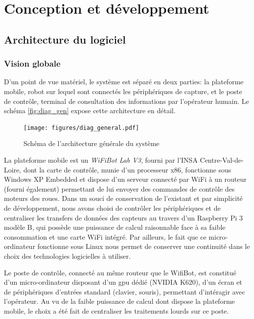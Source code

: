 \chapter{Conception et développement}
\label{ch:condev}

	\section{Architecture du logiciel}

		\subsection{Vision globale}
			
			D'un point de vue matériel, le système est séparé en deux parties: la plateforme mobile, robot sur lequel sont connectés les périphériques de capture, et le poste de contrôle, terminal de consultation des informations par l'opérateur humain. Le schéma \autoref{fig:diag_gen} expose cette architecture en détail.
			\begin{figure}[h]
			{
				\centering
				\texttt{[image: figures/diag\_general.pdf]}
				\caption{Schéma de l'architecture générale du système}
				\label{fig:diag_gen}
			}
			\end{figure}
			\par
			La plateforme mobile est un \emph{WiFiBot Lab V3}\cite{wifibot}, fourni par l'INSA Centre-Val-de-Loire, dont la carte de contrôle, munie d'un processeur x86, fonctionne sous Windows XP Embedded et dispose d'un serveur connecté par WiFi à un routeur (fourni également) permettant de lui envoyer des commandes de contrôle des moteurs des roues. Dans un souci de conservation de l'existant et par simplicité de développement, nous avons choisi de contrôler les périphériques et de centraliser les transfers de données des capteurs au travers d'un Raspberry Pi 3 modèle B, qui possède une puissance de calcul raisonnable face à sa faible consommation et une carte WiFi intégré. Par ailleurs, le fait que ce micro-ordinateur fonctionne sous Linux nous permet de conserver une continuité dans le choix des technologies logicielles à utiliser.
			\par
			Le poste de contrôle, connecté au même routeur que le WifiBot, est constitué d'un micro-ordinateur disposant d'un \gls{gpu} dédié (NVIDIA K620), d'un écran et de périphériques d'entrées standard (clavier, souris), permettant d'intéragir avec l'opérateur. Au vu de la faible puissance de calcul dont dispose la plateforme mobile, le choix a été fait de centraliser les traitements lourds sur ce poste.
